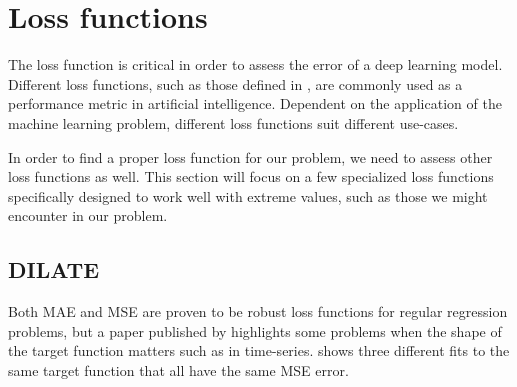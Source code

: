 
\section{Loss functions}
\label{section:RelatedWork:Loss}

The loss function is critical in order to assess the error of a deep learning model.
Different loss functions, such as those defined in ,
are commonly used as a performance metric in artificial intelligence.
Dependent on the application of the machine learning problem, different loss functions suit different use-cases.

In order to find a proper loss function for our problem, we need to assess other loss functions as well.
This section will focus on a few specialized loss functions specifically designed to work well with extreme values, such as those we might encounter in our problem.

\subsection{DILATE}

Both MAE and MSE are proven to be robust loss functions for regular regression problems,
but a paper published by \citeauthor{Guen2019} highlights some problems when the shape of the target function matters
such as in time-series.
 shows three different fits to the same target function that all have
the same MSE error.

